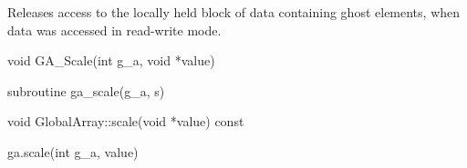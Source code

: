 \documentclass[12pt]{article}
\begin{document}
\local

\begin{desc}

Releases access to the locally held block of data containing ghost elements,
when data was accessed in read-write mode.

\end{desc}



\begin{capi}
\begin{ccode}
void GA_Scale(int g_a, void *value)
\end{ccode}
\begin{funcargs}
\end{funcargs}
\end{capi}

\begin{fapi}
\begin{fcode}
subroutine ga_scale(g_a, s)
\end{fcode}
\begin{funcargs}
\end{funcargs}
\end{fapi}

\begin{cxxapi}
\begin{cxxcode}
void GlobalArray::scale(void *value) const
\end{cxxcode}
\begin{funcargs}
\end{funcargs}
\end{cxxapi}

\begin{pyapi}
\begin{pycode}
ga.scale(int g_a, value)
\end{pycode}
\begin{funcargs}
\end{funcargs}
\end{pyapi}
\end{document}
